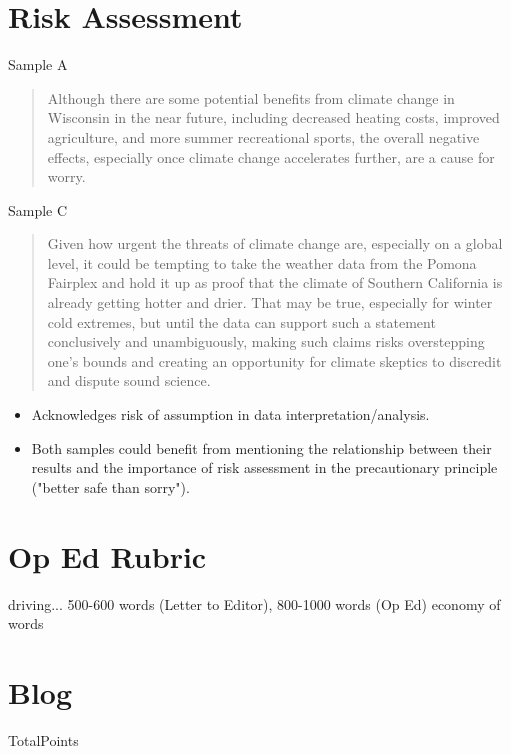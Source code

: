 \documentclass{article}\usepackage[]{graphicx}\usepackage[]{color}
\begin{document}
\section{Risk Assessment}
Sample A
\begin{quote}
Although there are some potential benefits from climate change in Wisconsin in the near future, including decreased heating costs, improved agriculture, and more summer recreational sports, the overall negative effects, especially once climate change accelerates further, are a cause for worry.
\end{quote}

Sample C
\begin{quote}
Given how urgent the threats of climate change are, especially on a global level, it could be tempting to take the weather data from the Pomona Fairplex and hold it up as proof that the climate of Southern California is already getting hotter and drier. That may be true, especially for winter cold extremes, but until the data can support such a statement conclusively and unambiguously, making such claims risks overstepping one’s bounds and creating an opportunity for climate skeptics to discredit and dispute sound science.
\end{quote}
\begin{itemize}
\item Acknowledges risk of assumption in data interpretation/analysis. 
  \item Both samples could benefit from mentioning the relationship between their results and the importance of risk assessment in the precautionary principle ("better safe than sorry"). 
\end{itemize}

\newpage

\section{Op Ed Rubric}

driving...
500-600 words (Letter to Editor), 
800-1000 words (Op Ed)
economy of words

\section{Blog}
TotalPoints
\end{document}
